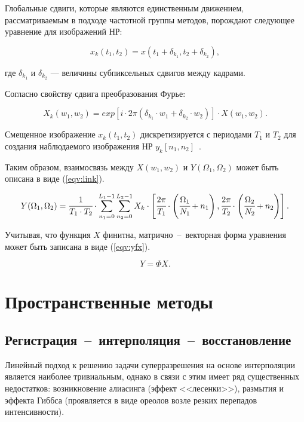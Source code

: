 Глобальные сдвиги, которые являются единственным движением, рассматриваемым в подходе частотной группы методов, порождают следующее уравнение для изображений НР:

\begin{equation}
    x_k(t_1, t_2) = x(t_1 + \delta_{k_1}, t_2 + \delta_{k_2}),
\end{equation}

где $\delta_{k_1}$ и $\delta_{k_2}$ --- величины субпиксельных сдвигов между кадрами.

Согласно свойству сдвига преобразования Фурье:

\begin{equation}
    X_k(w_1, w_2) = exp[i\cdot2\pi(\delta_{k_1}\cdot w_1 + \delta_{k_2}\cdot w_2)]\cdot X(w_1, w_2).
\end{equation}

Смещенное изображение $x_k(t_1, t_2)$ дискретизируется с периодами $T_1$ и $T_2$ для создания наблюдаемого изображения НР $y_k[n_1, n_2]$~\cite{frequency}.

Таким образом, взаимосвязь между $X(w_1, w_2)$ и $Y(\Omega_1, \Omega_2)$ может быть описана в виде (\ref{eqv:link}).

\begin{equation}\label{eqv:link}
    Y(\Omega_1, \Omega_2) = \cfrac{1}{T_1\cdot T_2} \cdot \sum_{n_1 = 0}^{L_1 - 1} \sum_{n_2 = 0}^{L_2 - 1} X_k \cdot \left[\cfrac{2\pi}{T_1} \cdot \left(\cfrac{\Omega_1}{N_1} + n_1\right), \cfrac{2\pi}{T_2} \cdot \left(\cfrac{\Omega_2}{N_2} + n_2\right)\right].
\end{equation}

Учитывая, что функция $X$ финитна, матрично~--~векторная форма уравнения может быть записана в виде (\ref{eqv:yfx}).

\begin{equation}\label{eqv:yfx}
    Y = \Phi X.
\end{equation}

\section{Пространственные методы}

\subsection{Регистрация~--~интерполяция~--~восстановление}

Линейный подход к решению задачи суперразрешения на основе интерполяции является наиболее тривиальным, однако в связи с этим имеет ряд существенных недостатков: возникновение алиасинга (эффект <<лесенки>>), размытия и эффекта Гиббса (проявляется в виде ореолов возле резких перепадов интенсивности). 

